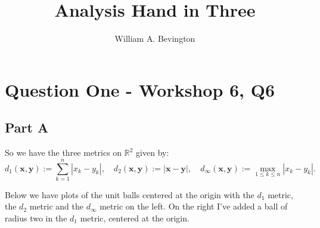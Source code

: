 \documentclass{article}
\author{William A. Bevington}
\title{Analysis Hand in Three}
\date{}
\def \R {\mathbb{R}}
\def \x {\textbf{x}}
\def \y {\textbf{y}}
\begin{document}
\maketitle
\section*{Question One - Workshop 6, Q6}
\subsection*{Part A}
So we have the three metrics on $\R^2$ given by:
	\[
		d_1(\x,\y) := \sum_{k=1}^n |x_k-y_k|, \quad
		d_2(\x,\y) := |\x-\y|, \quad
		d_\infty(\x,\y) := \max_{1\leq k\leq n}|x_k-y_k|.
	\]

Below we have plots of the unit balls centered at the origin with the {\color{red}$d_1$ metric}, the {\color{blue}$d_2$ metric} and the {\color{green}$d_\infty$ metric} on the left. On the right I've added a ball of radius two in the {\color{orange} $d_1$ metric}, centered at the origin.
\end{document}
